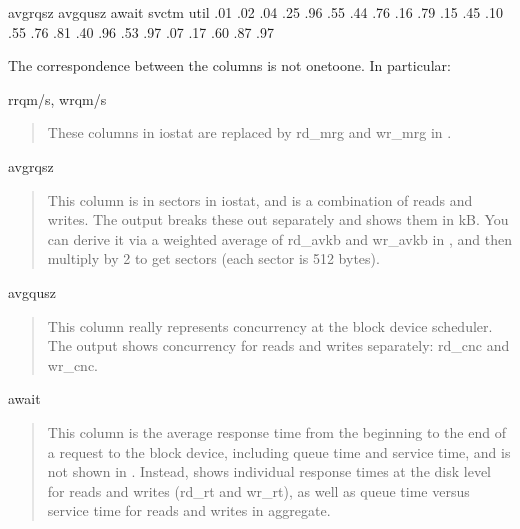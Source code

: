 \documentclass[letterpaper,10pt,english]{sphinxmanual}
\begin{document}
\begin{sphinxVerbatim}[commandchars=\\\{\}]
                avgrq\PYGZhy{}sz avgqu\PYGZhy{}sz  await  svctm  \PYGZpc{}util
                   .01     .02   .04   .25   .96
                   .55     .44  .76   .16   .79
                   .15     .45  .10   .55  .76
                   .81    .40  .96   .53  .97
                   .07     .17  .60   .87   .97
\end{sphinxVerbatim}

\sphinxAtStartPar
The correspondence between the columns is not one\sphinxhyphen{}to\sphinxhyphen{}one.  In particular:

\sphinxAtStartPar
rrqm/s, wrqm/s
\begin{quote}

\sphinxAtStartPar
These columns in iostat are replaced by rd\_mrg and wr\_mrg in .
\end{quote}

\sphinxAtStartPar
avgrq\sphinxhyphen{}sz
\begin{quote}

\sphinxAtStartPar
This column is in sectors in iostat, and is a combination of reads and writes.
The  output breaks these out separately and shows them in kB.  You
can derive it via a weighted average of rd\_avkb and wr\_avkb in , and
then multiply by 2 to get sectors (each sector is 512 bytes).
\end{quote}

\sphinxAtStartPar
avgqu\sphinxhyphen{}sz
\begin{quote}

\sphinxAtStartPar
This column really represents concurrency at the block device scheduler.  The
 output shows concurrency for reads and writes separately: rd\_cnc
and wr\_cnc.
\end{quote}

\sphinxAtStartPar
await
\begin{quote}

\sphinxAtStartPar
This column is the average response time from the beginning to the end of a
request to the block device, including queue time and service time, and is not
shown in .  Instead,  shows individual response times at
the disk level for reads and writes (rd\_rt and wr\_rt), as well as queue time
versus service time for reads and writes in aggregate.
\end{quote}
\end{document}
